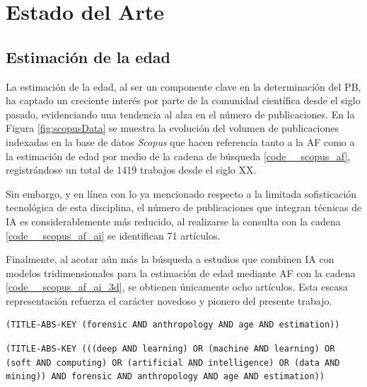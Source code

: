 \chapter{Estado del Arte}

\section{Estimación de la edad}
La estimación de la edad, al ser un componente clave en la determinación del PB, ha captado un creciente interés por parte de la comunidad científica desde el siglo pasado, evidenciando una tendencia al alza en el número de publicaciones. En la Figura \ref{fig:scopusData} se muestra la evolución del volumen de publicaciones indexadas en la base de datos \textit{Scopus} que hacen referencia tanto a la AF como a la estimación de edad por medio de la cadena de búsqueda \ref{code__scopus_af}, registrándose un total de 1419 trabajos desde el siglo XX.

Sin embargo, y en línea con lo ya mencionado respecto a la limitada sofisticación tecnológica de esta disciplina, el número de publicaciones que integran técnicas de IA es considerablemente más reducido, al realizarse la consulta con la cadena \ref{code__scopus_af_ai} se identifican 71 artículos.

Finalmente, al acotar aún más la búsqueda a estudios que combinen IA con modelos tridimensionales para la estimación de edad mediante AF con la cadena \ref{code__scopus_af_ai_3d}, se obtienen únicamente ocho artículos. Esta escasa representación refuerza el carácter novedoso y pionero del presente trabajo.

\begin{lstlisting}[caption={Cadena de búsqueda de \textit{Scopus} para obtener publicaciones de AF que referencian la estimación de la edad.}, captionpos=b, label=code__scopus_af, style=Consola]
(TITLE-ABS-KEY (forensic AND anthropology AND age AND estimation))
\end{lstlisting}
            
\begin{lstlisting}[caption={Cadena de búsqueda de \textit{Scopus} para obtener publicaciones de AF que referencian la estimación de la edad y hacen uso de alguna técnica de IA}, captionpos=b, label=code__scopus_af_ai, style=Consola]
(TITLE-ABS-KEY (((deep AND learning) OR (machine AND learning) OR (soft AND computing) OR (artificial AND intelligence) OR (data AND mining)) AND forensic AND anthropology AND age AND estimation))
\end{lstlisting}
            
